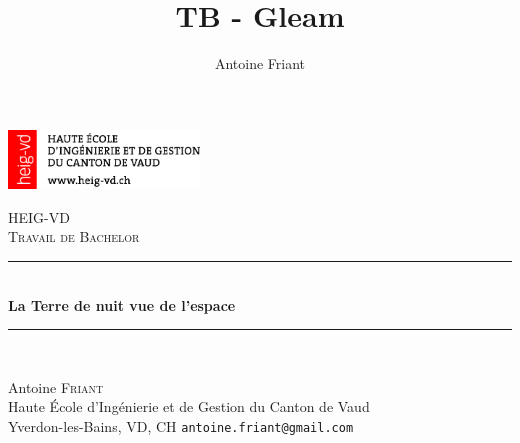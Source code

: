\documentclass[a4paper, 11pt]{report}
\title{TB - Gleam}
\author{Antoine Friant}
\begin{document}
\begin{titlepage}

\newcommand{\HRule}{\rule{\linewidth}{0.5mm}} %

\includegraphics[width=2in]{img/logoheig.png}\\ %

\vspace{1in}

\center %
 

\textsc{\LARGE HEIG-VD}\\[1.5cm] %
\textsc{\Large Travail de Bachelor}\\[0.5cm] %


\HRule \\[0.4cm]
{ \huge \bfseries La Terre de nuit vue de l'espace }\\ %
\Large\HRule \\[2cm]
\normalsize

\begin{minipage}[t]{0.48\textwidth}
\begin{flushleft} \large
Antoine \textsc{Friant} \\
\normalsize
Haute École d'Ingénierie et de Gestion du Canton de Vaud\\
Yverdon-les-Bains, VD, CH
\texttt{antoine.friant@gmail.com}
\end{flushleft}
\end{minipage}
~
\begin{minipage}[t]{0.49\textwidth}
\begin{flushright} \large
\end{flushright}
\end{minipage}\\[2cm]




\end{titlepage}
\end{document}
